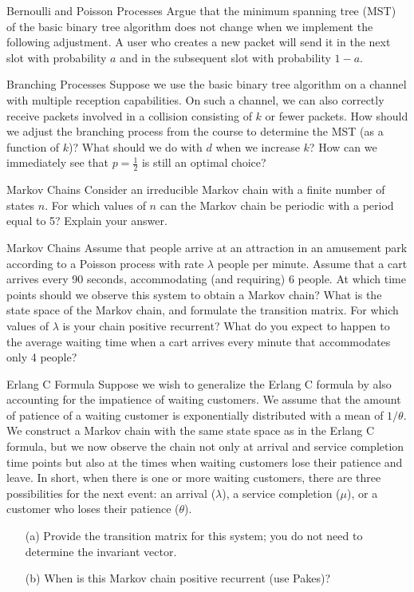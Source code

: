 \begin{problem}{Bernoulli and Poisson Processes}
Argue that the minimum spanning tree (MST) of the basic binary tree algorithm does not change when we implement the following adjustment. A user who creates a new packet will send it in the next slot with probability $a$ and in the subsequent slot with probability $1 - a$.
\end{problem}

\begin{problem}{Branching Processes}
Suppose we use the basic binary tree algorithm on a channel with multiple reception capabilities. On such a channel, we can also correctly receive packets involved in a collision consisting of $k$ or fewer packets. How should we adjust the branching process from the course to determine the MST (as a function of $k$)? What should we do with $d$ when we increase $k$? How can we immediately see that $p = \frac{1}{2}$ is still an optimal choice?
\end{problem}

\begin{problem}{Markov Chains}
Consider an irreducible Markov chain with a finite number of states $n$. For which values of $n$ can the Markov chain be periodic with a period equal to 5? Explain your answer.
\end{problem}

\begin{problem}{Markov Chains}
Assume that people arrive at an attraction in an amusement park according to a Poisson process with rate $\lambda$ people per minute. Assume that a cart arrives every 90 seconds, accommodating (and requiring) 6 people. At which time points should we observe this system to obtain a Markov chain? What is the state space of the Markov chain, and formulate the transition matrix. For which values of $\lambda$ is your chain positive recurrent? What do you expect to happen to the average waiting time when a cart arrives every minute that accommodates only 4 people?
\end{problem}

\begin{problem}{Erlang C Formula}
Suppose we wish to generalize the Erlang C formula by also accounting for the impatience of waiting customers. We assume that the amount of patience of a waiting customer is exponentially distributed with a mean of $1/\theta$. We construct a Markov chain with the same state space as in the Erlang C formula, but we now observe the chain not only at arrival and service completion time points but also at the times when waiting customers lose their patience and leave. In short, when there is one or more waiting customers, there are three possibilities for the next event: an arrival ($\lambda$), a service completion ($\mu$), or a customer who loses their patience ($\theta$).
\begin{itemize}
    \item[(a)] Provide the transition matrix for this system; you do not need to determine the invariant vector.
    \item[(b)] When is this Markov chain positive recurrent (use Pakes)?
\end{itemize}
\end{problem}

